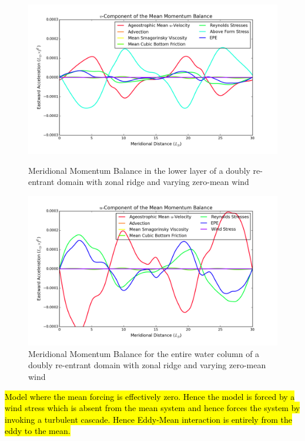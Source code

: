 \documentclass[12pt,a4paper]{report}
\begin{document}
 
 \begin{figure}
 	\centering
 	\begin{minipage}[b]{0.45\linewidth}
 		\centering
 		\includegraphics[width=\linewidth ]{vmom_1}
 		\caption{Meridional Momentum Balance in the lower layer of 
 			a doubly re-entrant domain with 
 			zonal ridge and varying zero-mean wind}
 		\label{fig:vmomlayer1}
 	\end{minipage}
 	\quad
 	\begin{minipage}[b]{0.45\linewidth}
 		\centering
 		\includegraphics[width=\linewidth ]{vmom_4}
 		\caption{Meridional Momentum Balance for the entire water column of 
 			a doubly re-entrant domain with 
 			zonal ridge and varying zero-mean wind}
 		\label{fig:vmomtotal}
 	\end{minipage}
 \end{figure}
 	

\hl{Model where the mean forcing is effectively zero. 
Hence the model is forced by a wind stress which is
absent from the mean system and hence forces the
system by 
invoking a turbulent cascade. Hence Eddy-Mean
interaction is entirely from the eddy to the mean.}
\end{document}
